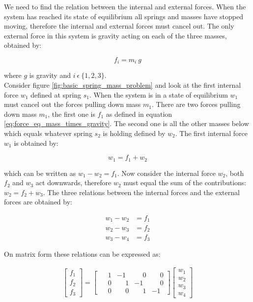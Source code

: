 We need to find the relation between the internal and external
forces. When the system has reached its state of equilibrium all
springs and masses have stopped moving, therefore the internal and external
forces must cancel out. The only external force in this
system is gravity acting on each of the three masses, obtained by:

\begin{equation}
\label{eq:force_eq_mass_times_gravity}
f_i = m_i \ g
\end{equation}

where $g$ is gravity and $i \ \epsilon \ \lbrace 1,2,3
\rbrace$.\\

Consider figure \vref{fig:basic_spring_mass_problem} and look at the
first internal force $w_1$ defined at spring $s_1$. When the system is
in a state of equilibrium $w_1$ must cancel out the forces pulling
down mass $m_1$. There are two forces pulling down mass $m_1$, the first
one is $f_1$ as defined in equation
\eqref{eq:force_eq_mass_times_gravity}. The second one is all the 
other masses below which equals whatever spring $s_2$ is
holding defined by $w_2$. The first internal force $w_1$ is obtained by:

\begin{equation}  
\label{eq:w1_equal_e2_times_f1}
w_1 = f_1 + w_2
\end{equation}

which can be written as $w_1 - w_2 = f_1$. Now consider the internal
force $w_2$, both $f_2$ and $w_3$ act downwards, therefore $w_2$ must
equal the sum of the contributions: $w_2 = f_2 +w_3$. The three relations
between the internal forces and the external forces are obtained by: 

\begin{align*}
w_1 - w_2 &= f_1 \\
w_2 - w_3 &= f_2 \\
w_3 - w_4 &= f_3
\end{align*}

On matrix form these relations can be expressed as:

\begin{align}
\begin{bmatrix}
f_1 \\ f_2\\ f_3
\end{bmatrix}
=
\begin{bmatrix}
  \phantom{-}1 &           -1 & \phantom{-}0 & \phantom{-}0 \\
  \phantom{-}0 & \phantom{-}1 &           -1 & \phantom{-}0 \\
  \phantom{-}0 & \phantom{-}0 & \phantom{-}1 &           -1 
\end{bmatrix}
\begin{bmatrix}
w_1 \\ w_2 \\ w_3 \\ w_4
\end{bmatrix}
\end{align}

